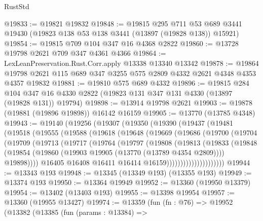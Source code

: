 \begin{lexlean}{RustStd}
\begin{coremodule}
@19833 := @19821 @19832
@19848 := @19815
    @295
    @711
    @53
    @689
    @3441
    @19430
    (@19823 @138 @53 @138 @3441 (@13897 (@19828 @138)) @15921)
@19854 := @19815 @709 @104 @347 @16 @4368 @2822
@19860 := @13728 @19798 @2621 @709 @347 @4361 @4366
@19864 := LexLeanPreservation.Rust.Corr.apply @13338 @13340 @13342
@19878 := @19864 @19798 @2621 @115 @689 @347 @3255 @575 @2809 @4332 @2621 @4348 @4353 @4357 @19832
@19881 := @19810 @575 @689 @4332
@19896 := @19815
    @284
    @104
    @347
    @16
    @4330
    @2822
    (@19823 @131 @347 @131 @4330 (@13897 (@19828 @131)) @19794)
@19898 := @13914 @19798 @2621
@19903 := @19878 (@19881 (@19896 @19898)) @16142 @16159
@19905 := @13770 (@13785 @4348)
@19943 := @19140
    (@19256
      (@19307
        (@19350
          (@19390
            (@19437
              (@19481
                (@19518
                  (@19555
                    (@19588
                      (@19618
                        (@19648
                          (@19669
                            (@19686
                              (@19700
                                (@19704
                                  (@19709
                                    (@19713
                                      (@19717
                                        (@19764
                                          (@19797
                                            (@19808
                                              (@19813
                                                (@19833
                                                  (@19848
                                                    (@19854
                                                      (@19860
                                                        (@19903
                                                          @19905
                                                          (@13770 (@13789 @4354 @2809))))
                                                      @19898))))
                                              @16405
                                              @16408
                                              @16411
                                              @16414
                                              @16159)))))))))))))))))))))
@19944 := @13343 @193
@19948 := @13345 (@13349 @193) (@13355 @193)
@19949 := @13374 @193
@19950 := @13364 @19949
@19952 := @13360 (@19950 @13379)
@19954 := @13402 (@13403 @193)
@19955 := @13398 @19954
@19957 := @13360 (@19955 @13427)
@19974 := @13359
    (fun (fn : @76) =>
    @19952
      (@13382
        (@13385
          (fun (params : @13384) =>

\end{coremodule}
\end{lexlean}
